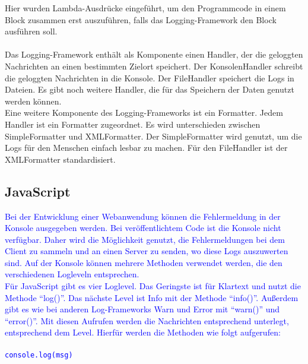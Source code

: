 {    Hier wurden Lambda-Ausdrücke eingeführt, um den Programmcode in einem Block zusammen erst auszuführen, falls das Logging-Framework den Block ausführen soll.
    \\
    \\
    Das Logging-Framework enthält als Komponente einen Handler, der die geloggten Nachrichten an einen bestimmten Zielort speichert.
    Der KonsolenHandler schreibt die geloggten Nachrichten in die Konsole.
    Der FileHandler speichert die Logs in Dateien.
    Es gibt noch weitere Handler, die für das Speichern der Daten genutzt werden können.
    \\
    Eine weitere Komponente des Logging-Frameworks ist ein Formatter.
    Jedem Handler ist ein Formatter zugeordnet.
    Es wird unterschieden zwischen SimpleFormatter und XMLFormatter.
    Der SimpleFormatter wird genutzt, um die Logs für den Menschen einfach lesbar zu machen.
    Für den FileHandler ist der XMLFormatter standardisiert.
}\autocite{rheinwerk, baeldung, examples}

\subsection{JavaScript}\label{subsec:javascript}
\textcolor{blue}{
    Bei der Entwicklung einer Webanwendung können die Fehlermeldung in der Konsole ausgegeben werden.
    Bei veröffentlichtem Code ist die Konsole nicht verfügbar.
    Daher wird die Möglichkeit genutzt, die Fehlermeldungen bei dem Client zu sammeln und an einen Server zu senden, wo diese Logs auszuwerten sind.
    Auf der Konsole können mehrere Methoden verwendet werden, die den verschiedenen Logleveln entsprechen.
    \\
    Für JavaScript gibt es vier Loglevel.
    Das Geringste ist für Klartext und nutzt die Methode \enquote{log()}.
    Das nächste Level ist Info mit der Methode \enquote{info()}.
    Außerdem gibt es wie bei anderen Log-Frameworks Warn und Error mit \enquote{warn()} und \enquote{error()}.
    Mit diesen Aufrufen werden die Nachrichten entsprechend unterlegt, entsprechend dem Level.
    Hierfür werden die Methoden wie folgt aufgerufen:
    \\
    \\
    \hspace*{10mm}
    \texttt{console.log(msg)}
}\autocite{stackify}

